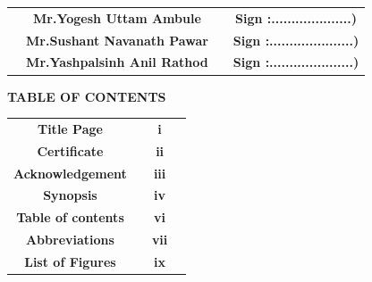\documentclass[12pt]{article}
\begin{document}
   
 \begin{tabular}{ c c c c } 
  \hspace{1.1in}&\textbf{Mr.Yogesh Uttam Ambule} & \hspace{0.5in}  & \textbf{ Sign :....................)} \\ [1mm] 
  \hspace{1.1in} &\textbf {Mr.Sushant Navanath Pawar}& \hspace{0.5in}   & \textbf{Sign :.....................) }\\[1mm]
  \hspace{1.1in}  &\textbf{ Mr.Yashpalsinh Anil Rathod } & \hspace{0.5in}  & \textbf{Sign :.....................) }\\[7mm]
 \end{tabular}   


\clearpage


\begin{center}
 \Large \textbf {TABLE OF CONTENTS }\\[15mm]
 \end{center}


\begin{tabular}{ c c c c } 
  \textbf{Title Page} & \hspace{3.5in}  & \textbf{i} \\ [5mm] 
  \textbf{Certificate} & \hspace{3.5in}  & \textbf{ii} \\ [5mm]
  \textbf{Acknowledgement} & \hspace{2.5in}  & \textbf{iii} \\ [5mm] 
  \textbf{Synopsis} & \hspace{2.5in}  & \textbf{iv} \\ [5mm] 
  \textbf{Table of contents} & \hspace{2.5in}  & \textbf{vi} \\ [5mm] 
  \textbf{Abbreviations} & \hspace{2.5in}  & \textbf{vii} \\ [5mm] 
  \textbf{List of Figures} & \hspace{2.5in}  & \textbf{ix} \\ [5mm]  
 \end{tabular}  
\end{document}
